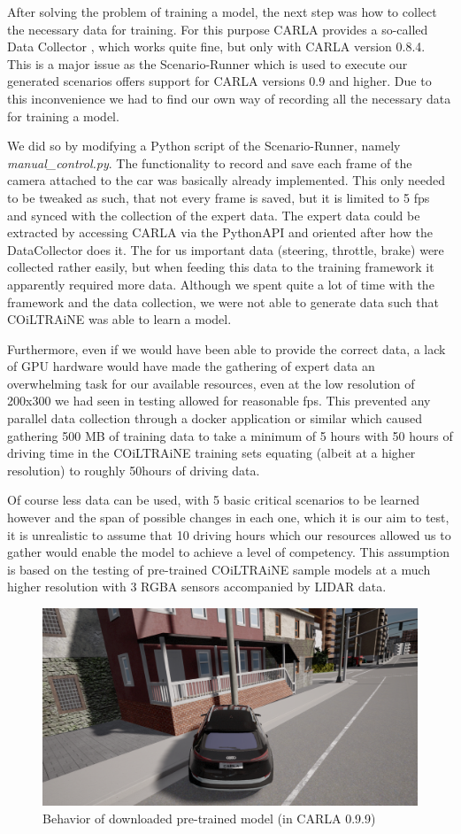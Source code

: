 \documentclass[conference, a4paper, 11pt]{IEEEtran}
\begin{document}
After solving the problem of training a model, the next step was how to collect the necessary data for training. For this purpose CARLA provides a so-called Data Collector \cite{CARLA:DataCollector}, which works quite fine, but only with CARLA version 0.8.4. This is a major issue as the Scenario-Runner which is used to execute our generated scenarios offers support for CARLA versions 0.9 and higher. Due to this inconvenience we had to find our own way of recording all the necessary data for training a model.

We did so by modifying a Python script of the Scenario-Runner, namely \textit{manual\_control.py}. The functionality to record and save each frame of the camera attached to the car was basically already implemented. This only needed to be tweaked as such, that not every frame is saved, but it is limited to 5 fps and synced with the collection of the expert data. The expert data could be extracted by accessing CARLA via the PythonAPI and oriented after how the DataCollector does it. The for us important data (steering, throttle, brake) were collected rather easily, but when feeding this data to the training framework it apparently required more data.
Although we spent quite a lot of time with the framework and the data collection, we were not able to generate data such that COiLTRAiNE was able to learn a model.

Furthermore, even if we would have been able to provide the correct data, a lack of GPU hardware would have made the gathering of expert data an overwhelming task for our available resources, even at the low resolution of 200x300 we had seen in testing allowed for reasonable fps. This prevented any parallel data collection through a docker application or similar which caused gathering 500 MB of training data to take a minimum of 5 hours with 50 hours of driving time in the COiLTRAiNE training sets equating (albeit at a higher resolution) to roughly 50hours of driving data.

Of course less data can be used, with 5 basic critical scenarios to be learned however and the span of possible changes in each one, which it is our aim to test, it is unrealistic to assume that 10 driving hours which our resources allowed us to gather would enable the model to achieve a level of competency. This assumption is based on the testing of pre-trained COiLTRAiNE sample models at a much higher resolution with 3 RGBA sensors accompanied by LIDAR data.

\begin{figure}[ht]
    \centering
    \includegraphics[width=0.7\linewidth]{figures/trained_agent_fail.png}
    \caption{Behavior of downloaded pre-trained model (in CARLA 0.9.9)}
    \label{fig:trained_agent_fail}
\end{figure}
\end{document}
